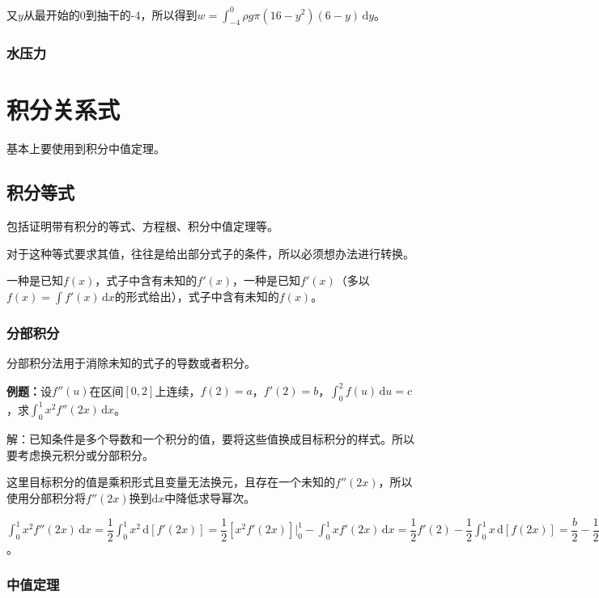 \documentclass[UTF8, 12pt]{ctexart}
\begin{document}
又$y$从最开始的0到抽干的-4，所以得到$w=\int_{-4}^0\rho g\pi(16-y^2)(6-y)\,\textrm{d}y$。

\subsubsection{水压力}

\section{积分关系式}

基本上要使用到积分中值定理。

\subsection{积分等式}

包括证明带有积分的等式、方程根、积分中值定理等。

对于这种等式要求其值，往往是给出部分式子的条件，所以必须想办法进行转换。

一种是已知$f(x)$，式子中含有未知的$f'(x)$，一种是已知$f'(x)$（多以$f(x)=\int f'(x)\,\textrm{d}x$的形式给出），式子中含有未知的$f(x)$。

\subsubsection{分部积分}

分部积分法用于消除未知的式子的导数或者积分。

\textbf{例题：}设$f''(u)$在区间$[0,2]$上连续，$f(2)=a$，$f'(2)=b$，$\int_0^2f(u)\,\textrm{d}u=c$，求$\int_0^1x^2f''(2x)\,\textrm{d}x$。

解：已知条件是多个导数和一个积分的值，要将这些值换成目标积分的样式。所以要考虑换元积分或分部积分。

这里目标积分的值是乘积形式且变量无法换元，且存在一个未知的$f''(2x)$，所以使用分部积分将$f''(2x)$换到$\textrm{d}x$中降低求导幂次。

$\int_0^1x^2f''(2x)\,\textrm{d}x=\dfrac{1}{2}\int_0^1x^2\,\textrm{d}[f'(2x)]=\dfrac{1}{2}[x^2f'(2x)]\bigg\vert_0^1-\int_0^1xf'(2x)\,\textrm{d}x=\dfrac{1}{2}f'(2)-\dfrac{1}{2}\int_0^1x\,\textrm{d}[f(2x)]=\dfrac{b}{2}-\dfrac{1}{2}[xf(2x)]\bigg\vert_0^1+\dfrac{1}{2}\int_0^1f(2x)\,\textrm{d}x=\dfrac{b}{2}-\dfrac{a}{2}+\dfrac{1}{4}\int_0^2f(u)\,\textrm{d}(u)=-\dfrac{a}{2}+\dfrac{b}{2}+\dfrac{c}{4}$。

\subsubsection{中值定理}
\end{document}
